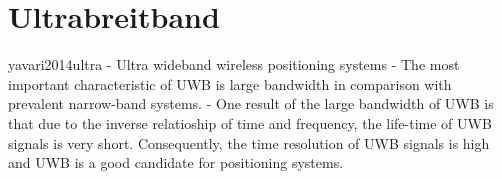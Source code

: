 \begin{comment}
Fragestellung:
- Welche elektrische Beschaltung ist notwendig um das DWM1000 Modul von DecaWave in Betrieb nehmen zu können?
- Wie erfolgt die Entfernungsmessung zwischen den einzelnen UWB--Modulen?
- Wie erfolgt der Datenaustausch zwischen einem UWB--Modul und der Verarbeitungseinheit?
\end{comment}

\begin{comment}
------------------------------------------------------------------------------------------
\end{comment}
\chapter{Ultrabreitband}

\begin{comment}
- Was ist UWB überhaupt?
- Wie unterscheidet es sich von der bisherigen Verfahren?
- Auflisten einige Eigenschaften
\end{comment}


yavari2014ultra - Ultra wideband wireless positioning systems
	- The most important characteristic of UWB is large bandwidth in comparison with
prevalent narrow-band systems.
	- One result of the large bandwidth of UWB is that due to the inverse relatioship of
time and frequency, the life-time of UWB signals is very short. Consequently, the
time resolution of UWB signals is high and UWB is a good candidate for positioning
systems.

